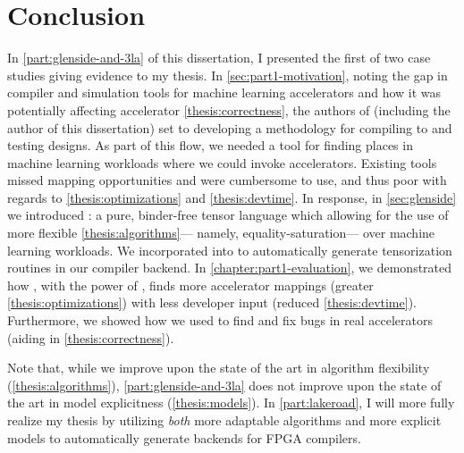 \chapter*{ Conclusion}

In \cref{part:glenside-and-3la}
  of this dissertation,
  I presented the first of two case studies
  giving evidence to my thesis.
In \cref{sec:part1-motivation}, 
  noting the gap in compiler and simulation tools
  for
  machine learning \glspl{accelerator}
  and how it was potentially affecting
  accelerator \cref{thesis:correctness},
  the authors of \TLA
  (including the author of this dissertation)
  set to developing a methodology for
  compiling to and testing
  designs.
As part of this flow,
  we needed a tool for finding places in
  machine learning workloads
  where we could invoke accelerators.
Existing
  tools missed mapping opportunities
  and were cumbersome to use,
  and thus poor with regards to \cref{thesis:optimizations}
  and \cref{thesis:devtime}.
In response,
  in \cref{sec:glenside}
  we introduced \g:
  a pure, binder-free tensor language
  which allowing for the use of
  more flexible \cref{thesis:algorithms}---%
  namely,
  \gls{equality-saturation}---%
  over machine learning workloads.
We incorporated \g into \TLA
  to automatically generate \gls{tensorization}
  routines
  in our compiler backend.
In \cref{chapter:part1-evaluation},
  we demonstrated how \TLA, with the power of \g,
  finds more accelerator mappings
  (greater \cref{thesis:optimizations})
  with less developer input
  (reduced \cref{thesis:devtime}).
Furthermore, we showed how we used \TLA
  to find and fix bugs in real
  accelerators (aiding in \cref{thesis:correctness}).

Note that, while we improve upon the state of the art 
  in algorithm flexibility (\cref{thesis:algorithms}),
  \cref{part:glenside-and-3la}
  does not improve upon the state of the art
  in model explicitness (\cref{thesis:models}).
In \cref{part:lakeroad}, I will
  more fully realize my thesis
  by utilizing \textit{both} more adaptable algorithms
  and more explicit models
  to automatically generate backends
  for FPGA compilers.
  
  
  